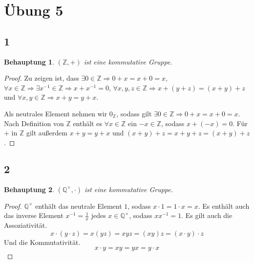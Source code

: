 \documentclass[a4paper,10pt]{article}
\newtheorem*{claim}{Behauptung}
\begin{document}
\section*{Übung 5}

\subsection*{1}

\begin{claim}
 $(\mathbb{Z}, +)$ ist eine kommutative Gruppe.
\end{claim}

\begin{proof}
 Zu zeigen ist, dass $\exists 0 \in \mathbb{Z} \Rightarrow 0 + x = x + 0 = x$, $\forall x \in \mathbb{Z} \Rightarrow \exists x^{-1} \in \mathbb{Z} \Rightarrow x + x^{-1} = 0$, $\forall x, y, z \in \mathbb{Z} \Rightarrow x + (y + z) = (x + y) + z$ und $\forall x, y \in \mathbb{Z} \Rightarrow x + y = y + x$.
 
 Als neutrales Element nehmen wir $0_{\mathbb{Z}}$, sodass gilt $\exists 0 \in \mathbb{Z} \Rightarrow 0 + x = x + 0 = x$.
 Nach Definition von $\mathbb{Z}$ enthält es $\forall x \in \mathbb{Z}$ ein $-x \in \mathbb{Z}$, sodass $x + (-x) = 0$.
 Für $+$ in $\mathbb{Z}$ gilt außerdem $x + y = y + x$ und $(x + y) + z = x + y + z = (x + y) + z$.
\end{proof}

\subsection*{2}

\begin{claim}
 $(\mathbb{Q}^\times, \cdot)$ ist eine kommutative Gruppe.
\end{claim}

\begin{proof}
 $\mathbb{Q^\times}$ enthält das neutrale Element $1$, sodass $x \cdot 1 = 1 \cdot x = x$.
 Es enthält auch das inverse Element $x^{-1} = \frac{1}{x}$ jedes $x \in \mathbb{Q}^\times$, sodass $xx^{-1} = 1$.
 Es gilt auch die Assoziativität.
 \begin{equation*}
  x \cdot (y \cdot z) = x(yz) = xyz = (xy)z = (x \cdot y) \cdot z
 \end{equation*}
 Und die Kommutativität.
 \begin{equation*}
  x \cdot y = xy = yx = y \cdot x
 \end{equation*}
\end{proof}
\end{document}
